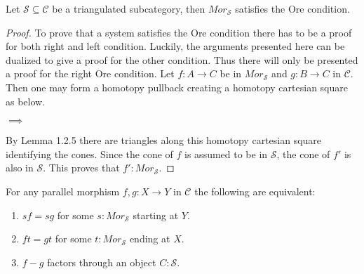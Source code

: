     \begin{prop}
        Let $\mathcal{S}\subseteq\mathcal{C}$ be a triangulated subcategory, then $Mor_\mathcal{S}$ satisfies the Ore condition.
    \end{prop}

    \begin{proof}
        To prove that a system satisfies the Ore condition there has to be a proof for both right and left condition. Luckily, the arguments presented here can be dualized to give a proof for the other condition. Thus there will only be presented a proof for the right Ore condition.
        Let $f:A\rightarrow C$ be in $Mor_\mathcal{S}$ and $g:B\rightarrow C$ in $\mathcal{C}$. Then one may form a homotopy pullback creating a homotopy cartesian square as below.
        \begin{center}
            $\implies$
        \end{center}
        By Lemma 1.2.5 there are triangles along this homotopy cartesian square identifying the cones. Since the cone of $f$ is assumed to be in $\mathcal{S}$, the cone of $f'$ is also in $\mathcal{S}$. This proves that $f':Mor_\mathcal{S}$.
    \end{proof}

    \begin{prop}
        For any parallel morphism $f,g:X\rightarrow Y$ in $\mathcal{C}$ the following are equivalent:
        \begin{enumerate}
            \item $sf=sg$ for some $s:Mor_\mathcal{S}$ starting at $Y$.
            \item $ft=gt$ for some $t:Mor_\mathcal{S}$ ending at $X$.
            \item $f-g$ factors through an object $C:\mathcal{S}$.
        \end{enumerate}
    \end{prop}

